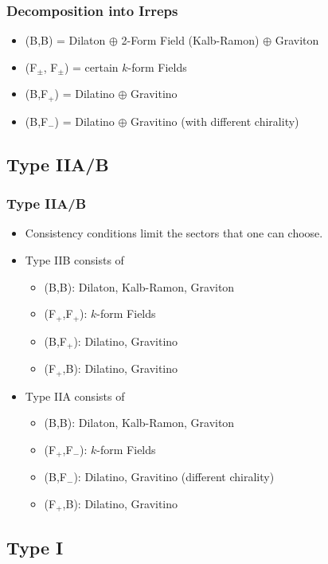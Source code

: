 \documentclass{beamer}
\begin{document}
\begin{frame}
  \frametitle{Decomposition into Irreps}
  \begin{itemize}
  \item (B,B) = Dilaton $\oplus$ 2-Form Field (Kalb-Ramon) $\oplus$ Graviton
  \item (F$_\pm$, F$_{\pm}$) = certain $k$-form Fields
  \item (B,F$_{+}$) = Dilatino $\oplus$ Gravitino
  \item (B,F$_{-}$) = Dilatino $\oplus$ Gravitino (with different chirality)
  \end{itemize}
\end{frame}

\subsection{Type IIA/B}



\begin{frame}
  \frametitle{Type IIA/B}
  \begin{itemize}
  \item Consistency conditions limit the sectors that one can choose. \pause
  \item Type IIB consists of
    \begin{itemize}
    \item (B,B): Dilaton, Kalb-Ramon, Graviton
    \item (F$_{+}$,F$_{+}$): $k$-form Fields
    \item (B,F$_{+}$): Dilatino, Gravitino
    \item (F$_{+}$,B): Dilatino, Gravitino
    \end{itemize}\pause
    
  \item Type IIA consists of
    \begin{itemize}
    \item (B,B): Dilaton, Kalb-Ramon, Graviton
    \item (F$_{+}$,F$_{-}$): $k$-form Fields
    \item (B,F$_{-}$): Dilatino, Gravitino (different chirality)
    \item (F$_{+}$,B): Dilatino, Gravitino
    \end{itemize}

  \end{itemize}
\end{frame}

\subsection{Type I}
\end{document}
